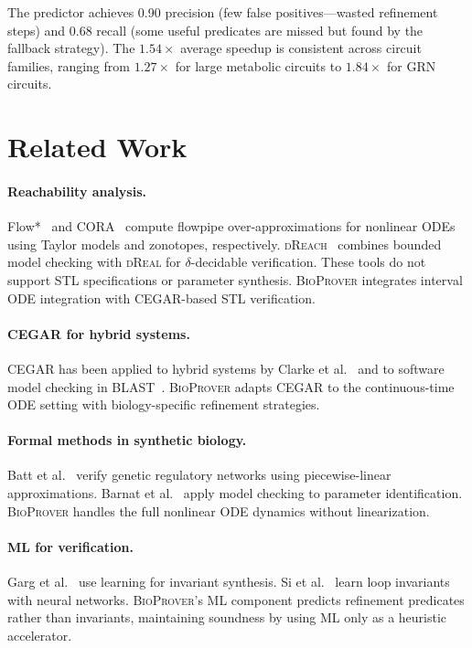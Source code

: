 \documentclass[11pt]{article}
\newcommand{\bioprover}{\textsc{BioProver}}
\newcommand{\cegar}{\textsc{CEGAR}}
\newcommand{\dreach}{\textsc{dReach}}
\newcommand{\dreal}{\textsc{dReal}}
\newcommand{\stl}{\textsc{STL}}
\begin{document}
The predictor achieves 0.90 precision (few false positives---wasted
refinement steps) and 0.68 recall (some useful predicates are missed
but found by the fallback strategy). The $1.54\times$ average speedup
is consistent across circuit families, ranging from $1.27\times$ for
large metabolic circuits to $1.84\times$ for GRN circuits.

\section{Related Work}
\label{sec:related}

\paragraph{Reachability analysis.}
Flow*~\cite{chen2013flow} and CORA~\cite{althoff2015cora} compute
flowpipe over-approximations for nonlinear ODEs using Taylor models
and zonotopes, respectively. \dreach{}~\cite{kong2015dreach}
combines bounded model checking with \dreal{} for
$\delta$-decidable verification. These tools do not support \stl{}
specifications or parameter synthesis. \bioprover{} integrates
interval ODE integration with \cegar{}-based \stl{} verification.

\paragraph{CEGAR for hybrid systems.}
\cegar{} has been applied to hybrid systems by Clarke et
al.~\cite{clarke2003verification} and to software model checking in
BLAST~\cite{beyer2007configurable}. \bioprover{} adapts \cegar{} to
the continuous-time ODE setting with biology-specific refinement
strategies.

\paragraph{Formal methods in synthetic biology.}
Batt et al.~\cite{batt2007genetic} verify genetic regulatory networks
using piecewise-linear approximations. Barnat et
al.~\cite{barnat2009parameter} apply model checking to parameter
identification. \bioprover{} handles the full nonlinear ODE dynamics
without linearization.

\paragraph{ML for verification.}
Garg et al.~\cite{garg2014ice} use learning for invariant synthesis.
Si et al.~\cite{si2018learning} learn loop invariants with neural
networks. \bioprover{}'s ML component predicts refinement predicates
rather than invariants, maintaining soundness by using ML only as a
heuristic accelerator.
\end{document}
